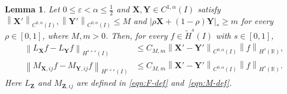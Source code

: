 \documentclass[11pt,reqno]{amsart}
\theoremstyle{plain}
\newtheorem{lemma}[theorem]{Lemma}
\theoremstyle{definition}
\numberwithin{equation}{section}
\newcommand{\paren}[1]{\left(#1\right)}
\newcommand{\p}{\partial}
\newcommand{\wt}[1]{\widetilde{#1}}
\newcommand{\bm}[1]{\boldsymbol{#1}}
\newcommand{\abs}[1]{\left\lvert #1 \right\rvert}
\newcommand{\norm}[1]{\left\lVert #1 \right\rVert}
\newcommand{\R}{\mathbb{R}}
\newcommand{\ci}[1]{C^{#1}(I)}
\newcommand{\hi}[1]{H^{#1}(I)}
\newcommand{\thi}[1]{\wt H^{#1}(I)}
\newcommand{\hr}[1]{H^{#1}(\R)}
\begin{document}


\begin{lemma}\label{lem:LM-Lip}
Let $0\le\varepsilon<\alpha\le\frac12$ and
$\bm X,\bm Y\in\ci{1,\alpha}$ satisfy
$\norm{\bm X'}_{\ci{0,\alpha}},\norm{\bm Y'}_{\ci{0,\alpha}}\le M$ and
$\abs{\rho\bm X+(1-\rho)\bm Y}_*\ge m$ for every $\rho\in[0,1]$, where
$M,m>0$.
Then, for every $f\in\thi{s}$ with $s\in[0,1]$,
\begin{align}
    \norm{L_{\bm X}f-L_{\bm Y}f}_{\hi{s+\varepsilon}}
    &\le C_{M,m}
    \norm{\bm X'-\bm Y'}_{\ci{0,\alpha}}\norm{f}_{\hr{s}},
    \label{eqn:Lop-Lip}\\
    \norm{M_{\bm X,ij}f-M_{\bm Y,ij}f}_{\hi{s+\varepsilon}}
    &\le C_{M,m}
    \norm{\bm X'-\bm Y'}_{\ci{0,\alpha}}\norm{f}_{\hr{s}}.
    \label{eqn:Mop-Lip}
\end{align}
Here $L_{\bm Z}$ and $M_{\bm Z,ij}$ are defined in
\eqref{eqn:F-def} and~\eqref{eqn:M-def}.
\end{lemma}
\end{document}

